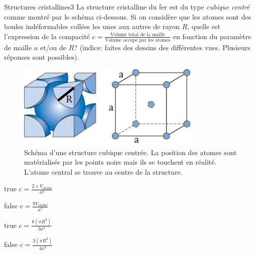         \begin{question}{31}{Structures cristallines}{3}{}
            La structure cristalline du fer est du type \emph{cubique centré} comme montré par le schéma ci-dessous. Si on considère que les atomes sont des boules indéformables collées les unes aux autres de rayon $R$, quelle est l'expression de la compacité $c = \frac{\text{Volume total de la maille}}{\text{Volume occupé par les atomes}}$ en fonction du paramètre de maille $a$ et/ou de $R$? (indice: faites des dessins des différentes vues. Plusieurs réponses sont possibles).
            \begin{figure}
                \centering
                \includegraphics[height = 4cm]{Antoine/Figures_Antoine/BCC.png}
                \caption{Schéma d'une structure cubique centrée. La position des atomes sont matérialisés par les points noirs mais ils se touchent en réalité. L'atome central se trouve au centre de la structure.}
            \end{figure}
        \end{question}
        \begin{reponses} 
            \item[true] $c = \frac{2\times V_\text{atome}}{a^3}$
            \item[false] $c = \frac{9V_\text{atome}}{a^3}$
            \item[true] $c = \frac{8(\pi R^3)}{3a^3}$
    	    \item[false] $c = \frac{3(\pi R^3)}{4a^3}$
        \end{reponses}
